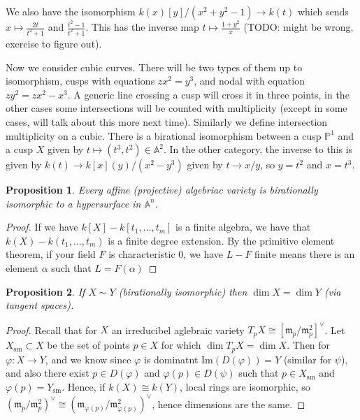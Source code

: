 \documentclass[12pt]{article}
\renewcommand{\P}{\mathbb{P}}
\newcommand{\A}{\mathbb{A}}
\newcommand{\m}{\mathfrak{m}}
\renewcommand{\phi}{\varphi}
\newtheorem{proposition}{Proposition}[section]
\begin{document}
    We also have the isomorphism $k(x)[y]/(x^2 + y^2 - 1) \to k(t)$ which sends $x \mapsto \frac{2t}{t^2 + 1}$ and $\frac{t^2 - 1}{t^2 + 1}$. This has the inverse map $t \mapsto \frac{1 + y^2}{x}$ (TODO: might be wrong, exercise to figure out). \par 
    \hfill \par 
    Now we consider cubic curves. There will be two types of them up to isomorphism, cusps with equations $zx^2 = y^3$, and nodal with equation $zy^2 = zx^2 - x^3$. A generic line crossing a cusp will cross it in three points, in the other cases some intersections will be counted with multiplicity (except in some cases, will talk about this more next time). Similarly we define intersection multiplicity on a cubic. There is a birational isomorphism between a cusp $\P^1$ and a cusp $X$ given by $t \mapsto (t^3, t^2) \in \A^2$. In the other category, the inverse to this is given by $k(t) \to k[x](y)/(x^2 - y^3)$ given by $t \to x/y$, so $y = t^2$ and $x = t^3$. \par 
    \begin{proposition}
        Every affine (projective) algebriac variety is birationally isomorphic to a hypersurface in $\A^n$. 
    \end{proposition}
    \begin{proof}
        If we have $k[X] - k[t_1, \dots, t_m]$ is a finite algebra, we have that $k(X) - k(t_1, \dots, t_m)$ is a finite degree extension. By the primitive element theorem, if your field $F$ is characteristic $0$, we have $L - F$ finite means there is an element $\alpha$ such that $L = F(\alpha)$ 
    \end{proof}
    \begin{proposition}
        If $X \sim Y$ (birationally isomorphic) then $\dim X = \dim Y$ (via tangent spaces).
    \end{proposition}
    \begin{proof}
        Recall that for $X$ an irreducibel aglebraic variety $T_pX \cong [\m_p/\m_p^2]^\vee$. Let $X_{\mathrm{sm}} \subset X$ be the set of points $p \in X$ for which $\dim T_pX = \dim X$. Then for $\phi:X \to Y$, and we know since $\phi$ is dominatnt $\overline{\mathrm{Im}(D(\phi))} = Y$ (similar for $\psi$), and also there exist $p \in D(\phi)$ and $\phi(p) \in D(\psi)$ such that $p \in X_{\mathrm{sm}}$ and $\phi(p) = Y_{\mathrm{sm}}$. Hence, if $k(X) \cong k(Y)$, local rings are isomorphic, so $(\m_p/\m_p^2)^\vee \cong (\m_{\phi(p)}/\m_{\phi(p)}^2)^\vee$, hence dimensions are the same. 
    \end{proof}
\end{document}
